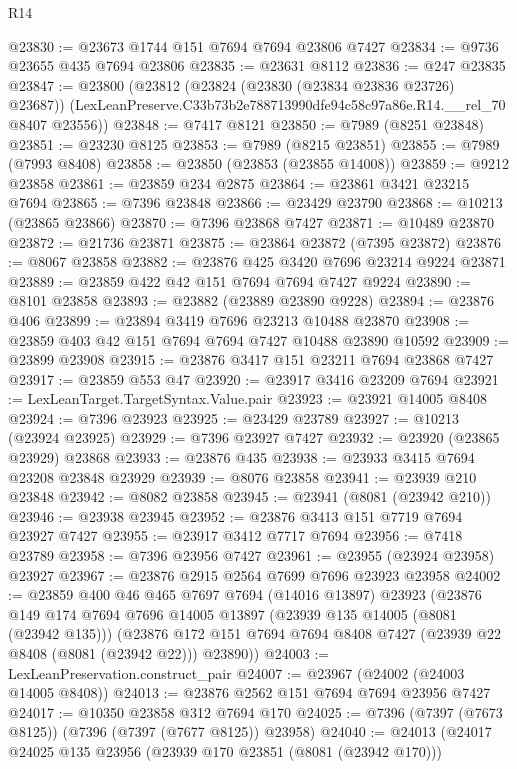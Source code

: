 \begin{lexlean}{R14}
\begin{coremodule}
@23830 := @23673 @1744 @151 @7694 @7694 @23806 @7427
@23834 := @9736 @23655 @435 @7694 @23806
@23835 := @23631 @8112
@23836 := @247 @23835
@23847 := @23800
    (@23812
      (@23824 (@23830 (@23834 @23836 @23726) @23687))
      (LexLeanPreserve.C33b73b2e788713990dfe94c58c97a86e.R14.__rel_70 @8407 @23556))
@23848 := @7417 @8121
@23850 := @7989 (@8251 @23848)
@23851 := @23230 @8125
@23853 := @7989 (@8215 @23851)
@23855 := @7989 (@7993 @8408)
@23858 := @23850 (@23853 (@23855 @14008))
@23859 := @9212 @23858
@23861 := @23859 @234 @2875
@23864 := @23861 @3421 @23215 @7694
@23865 := @7396 @23848
@23866 := @23429 @23790
@23868 := @10213 (@23865 @23866)
@23870 := @7396 @23868 @7427
@23871 := @10489 @23870
@23872 := @21736 @23871
@23875 := @23864 @23872 (@7395 @23872)
@23876 := @8067 @23858
@23882 := @23876 @425 @3420 @7696 @23214 @9224 @23871
@23889 := @23859 @422 @42 @151 @7694 @7694 @7427 @9224
@23890 := @8101 @23858
@23893 := @23882 (@23889 @23890 @9228)
@23894 := @23876 @406
@23899 := @23894 @3419 @7696 @23213 @10488 @23870
@23908 := @23859 @403 @42 @151 @7694 @7694 @7427 @10488 @23890 @10592
@23909 := @23899 @23908
@23915 := @23876 @3417 @151 @23211 @7694 @23868 @7427
@23917 := @23859 @553 @47
@23920 := @23917 @3416 @23209 @7694
@23921 := LexLeanTarget.TargetSyntax.Value.pair
@23923 := @23921 @14005 @8408
@23924 := @7396 @23923
@23925 := @23429 @23789
@23927 := @10213 (@23924 @23925)
@23929 := @7396 @23927 @7427
@23932 := @23920 (@23865 @23929) @23868
@23933 := @23876 @435
@23938 := @23933 @3415 @7694 @23208 @23848 @23929
@23939 := @8076 @23858
@23941 := @23939 @210 @23848
@23942 := @8082 @23858
@23945 := @23941 (@8081 (@23942 @210))
@23946 := @23938 @23945
@23952 := @23876 @3413 @151 @7719 @7694 @23927 @7427
@23955 := @23917 @3412 @7717 @7694
@23956 := @7418 @23789
@23958 := @7396 @23956 @7427
@23961 := @23955 (@23924 @23958) @23927
@23967 := @23876 @2915 @2564 @7699 @7696 @23923 @23958
@24002 := @23859
    @400
    @46
    @465
    @7697
    @7694
    (@14016 @13897)
    @23923
    (@23876
      @149
      @174
      @7694
      @7696
      @14005
      @13897
      (@23939 @135 @14005 (@8081 (@23942 @135)))
      (@23876 @172 @151 @7694 @7694 @8408 @7427 (@23939 @22 @8408 (@8081 (@23942 @22))) @23890))
@24003 := LexLeanPreservation.construct_pair
@24007 := @23967 (@24002 (@24003 @14005 @8408))
@24013 := @23876 @2562 @151 @7694 @7694 @23956 @7427
@24017 := @10350 @23858 @312 @7694 @170
@24025 := @7396 (@7397 (@7673 @8125)) (@7396 (@7397 (@7677 @8125)) @23958)
@24040 := @24013
    (@24017
      @24025
      @135
      @23956
      (@23939 @170 @23851 (@8081 (@23942 @170)))

\end{coremodule}
\end{lexlean}
